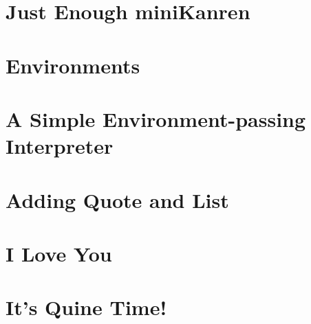 \documentclass[11pt]{book}
\begin{document}
\begin{schemeregion}
\chapter{Just Enough miniKanren}









\chapter{Environments}

\chapter{A Simple Environment-passing Interpreter}

\chapter{Adding Quote and List}

\chapter{I Love You}

\chapter{It's Quine Time!}






\backmatter




%


\printindex %

\end{schemeregion}
\end{document}
